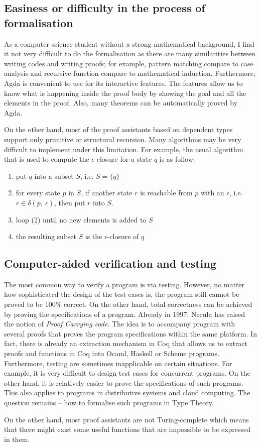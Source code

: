 \subsection{Easiness or difficulty in the process of formalisation}
\par As a computer science student without a strong mathematical
background, I find it not very difficult to do the
formalisation as there are many similarities between writing codes and writing
proofs; for example, pattern matching compare to case analysis and
recursive function compare to mathematical induction. Furthermore, Agda is convenient
to use for its interactive features. The features allow us to know
what is happening inside the proof body by showing the goal and all the
elements in the proof. Also, many theorems can be automatically proved
by Agda. 
\par On the other hand, most of the
proof assistants based on dependent types support only primitive or
structural recursion. Many algorithms may be very difficult to
implement under this limitation. For example, the usual algorithm that
is used to compute the \(\epsilon\)-closure for a state \(q\) is as follow:
\begin{enumerate}[nolistsep]
  \item put \(q\) into a subset \(S\), i.e. \(S = \{q\}\)
  \item for every state \(p\) in \(S\), if another state \(r\) is
    reachable from \(p\) with an \(\epsilon\), i.e. \(r \in
        \delta (p,\ \epsilon)\), then put \(r\) into \(S\). 
  \item loop (2) until no new elements is added to \(S\)
  \item the resulting subset \(S\) is the $\epsilon$-closure of \(q\)
\end{enumerate}

\par 


\subsection{Computer-aided verification and testing}
\par The most common way to verify a program is via testing. However,
no matter how sophisticated the design of the test cases is, the
program still cannot be proved to be 100\% correct. On the other
hand, total correctness can be achieved by proving the specifications
of a program. Already in 1997, Necula \cite{necula1997} has raised the
notion of \textit{Proof Carrying code}. The idea is to accompany
program with several proofs that proves the program specifications
within the same platform. In fact, there is already an
extraction mechanism \cite{letouzey2008} in Coq that allows us to
extract proofs and functions in Coq into Ocaml, Haskell or Scheme
programs. Furthermore, testing are sometimes inapplicable on certain
situations. For example, it is very difficult to design test cases for
concurrent programs. On the other hand, it is relatively easier to prove the
specifications of such programs. This also applies to programs in
distributive systems and cloud computing. The question remains -- how
to formalise such programs in Type Theory. 

\par On the other hand, most proof assistants are not Turing-complete
which means that there might exist some useful functions that are
impossible to be expressed in them. 